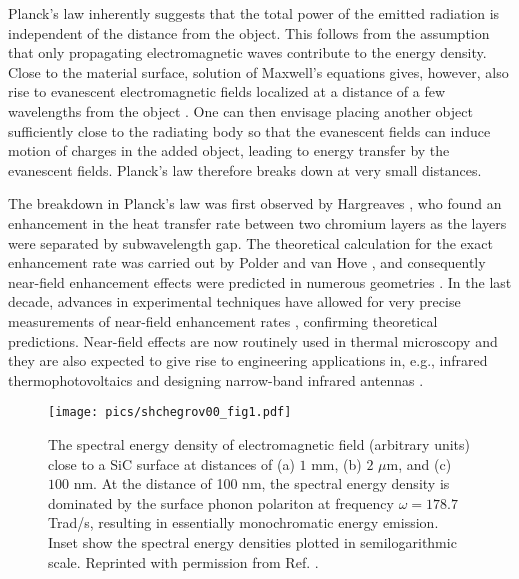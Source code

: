 Planck's law inherently suggests that the total power of the emitted radiation is independent of the distance from the object. This follows from the assumption that only propagating electromagnetic waves contribute to the energy density. Close to the material surface, solution of Maxwell's equations gives, however, also rise to evanescent electromagnetic fields localized at a distance of a few wavelengths from the object \cite{polder71}. One can then envisage placing another object sufficiently close to the radiating body so that the evanescent fields can induce motion of charges in the added object, leading to energy transfer by the evanescent fields. Planck's law therefore breaks down at very small distances. 

The breakdown in Planck's law was first observed by Hargreaves \cite{hargreaves69}, who found an enhancement in the heat transfer rate between two chromium layers as the layers were separated by subwavelength gap. The theoretical calculation for the exact enhancement rate was carried out by Polder and van Hove \cite{polder71}, and consequently near-field enhancement effects were predicted in numerous geometries \cite{loomis94,pendry99,carminati99,shchegrov00,mulet01,volokitin01}. In the last decade, advances in experimental techniques have allowed for very precise measurements of near-field enhancement rates \cite{kittel05,hu08,shen09,ottens11}, confirming theoretical predictions. Near-field effects are now routinely used in thermal microscopy \cite{majumdar99,muller-hirsch99,kittel05,kittel08} and they are also expected to give rise to engineering applications in, e.g., infrared thermophotovoltaics \cite{dimatteo01,narayanaswamy03,laroche06} and designing narrow-band infrared antennas \cite{greffet02}. 

\begin{figure}
\begin{center}
 \texttt{[image: pics/shchegrov00\_fig1.pdf]}
 \caption{The spectral energy density of electromagnetic field (arbitrary units) close to a SiC surface at distances of (a) $1$ mm, (b) $2$ $\mu$m, and (c) $100$ nm. At the distance of 100 nm, the spectral energy density is dominated by the surface phonon polariton at frequency $\omega=178.7$ Trad/s, resulting in essentially monochromatic energy emission. Inset show the spectral energy densities plotted in semilogarithmic scale. Reprinted with permission from Ref. \cite{shchegrov00}.}
\label{fig:intro_shchegrov}
\end{center}
\end{figure} 

